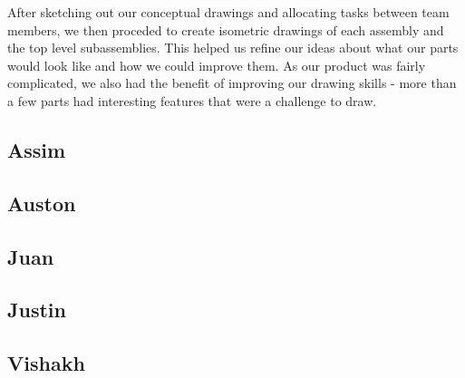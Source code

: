 After sketching out our conceptual drawings and allocating tasks between team members, we then proceded to create isometric drawings of each assembly and the top level subassemblies.
This helped us refine our ideas about what our parts would look like and how we could improve them.
As our product was fairly complicated, we also had the benefit of improving our drawing skills - more than a few parts had interesting features that were a challenge to draw.

\subsection{Assim}


\subsection{ Auston}


\subsection{Juan}


\subsection{Justin}


\subsection{Vishakh}


